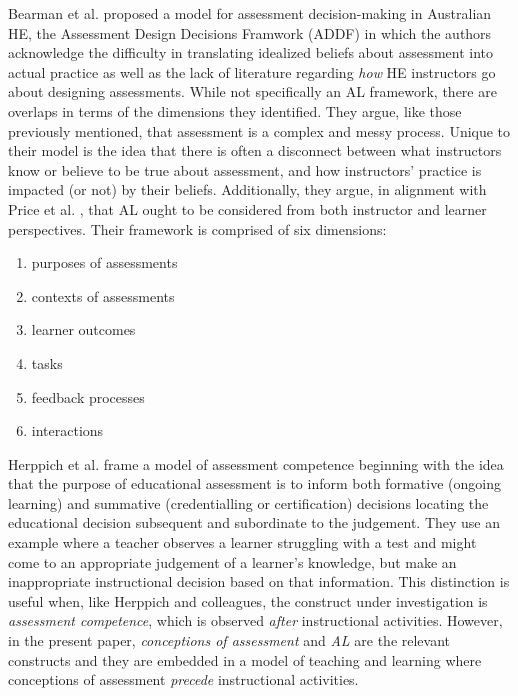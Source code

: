 \documentclass[
]{book}
\providecommand{\tightlist}{%
  \setlength{\itemsep}{0pt}\setlength{\parskip}{0pt}}
\begin{document}
Bearman et al. \citeyearpar{bearmanSupportAssessmentPractice2016} proposed a model for assessment decision-making in Australian HE, the Assessment Design Decisions Framwork (ADDF) in which the authors acknowledge the difficulty in translating idealized beliefs about assessment into actual practice as well as the lack of literature regarding \emph{how} HE instructors go about designing assessments. While not specifically an AL framework, there are overlaps in terms of the dimensions they identified. They argue, like those previously mentioned, that assessment is a complex and messy process. Unique to their model is the idea that there is often a disconnect between what instructors know or believe to be true about assessment, and how instructors' practice is impacted (or not) by their beliefs. Additionally, they argue, in alignment with Price et al. \citeyearpar{priceIfWasGoing2011}, that AL ought to be considered from both instructor and learner perspectives. Their framework is comprised of six dimensions:

\begin{enumerate}
\def\labelenumi{\arabic{enumi}.}
\tightlist
\item
  purposes of assessments
\item
  contexts of assessments
\item
  learner outcomes
\item
  tasks
\item
  feedback processes
\item
  interactions
\end{enumerate}

Herppich et al. \citeyearpar{herppichTeachersAssessmentCompetence2018} frame a model of assessment competence beginning with the idea that the purpose of educational assessment is to inform both formative (ongoing learning) and summative (credentialling or certification) decisions locating the educational decision subsequent and subordinate to the judgement. They use an example where a teacher observes a learner struggling with a test and might come to an appropriate judgement of a learner's knowledge, but make an inappropriate instructional decision based on that information. This distinction is useful when, like Herppich and colleagues, the construct under investigation is \emph{assessment competence}, which is observed \emph{after} instructional activities. However, in the present paper, \emph{conceptions of assessment} and \emph{AL} are the relevant constructs and they are embedded in a model of teaching and learning where conceptions of assessment \emph{precede} instructional activities.
\end{document}
